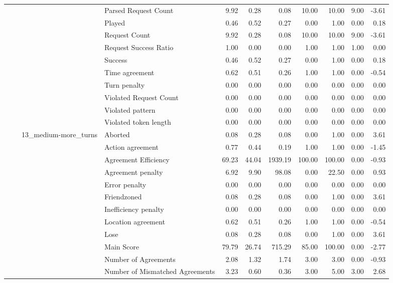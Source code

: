 \begin{tabular}{llllrrrrrrr}
 &  &  & Parsed Request Count & 9.92 & 0.28 & 0.08 & 10.00 & 10.00 & 9.00 & -3.61 \\
 &  &  & Played & 0.46 & 0.52 & 0.27 & 0.00 & 1.00 & 0.00 & 0.18 \\
 &  &  & Request Count & 9.92 & 0.28 & 0.08 & 10.00 & 10.00 & 9.00 & -3.61 \\
 &  &  & Request Success Ratio & 1.00 & 0.00 & 0.00 & 1.00 & 1.00 & 1.00 & 0.00 \\
 &  &  & Success & 0.46 & 0.52 & 0.27 & 0.00 & 1.00 & 0.00 & 0.18 \\
 &  &  & Time agreement & 0.62 & 0.51 & 0.26 & 1.00 & 1.00 & 0.00 & -0.54 \\
 &  &  & Turn penalty & 0.00 & 0.00 & 0.00 & 0.00 & 0.00 & 0.00 & 0.00 \\
 &  &  & Violated Request Count & 0.00 & 0.00 & 0.00 & 0.00 & 0.00 & 0.00 & 0.00 \\
 &  &  & Violated pattern & 0.00 & 0.00 & 0.00 & 0.00 & 0.00 & 0.00 & 0.00 \\
 &  &  & Violated token length & 0.00 & 0.00 & 0.00 & 0.00 & 0.00 & 0.00 & 0.00 \\
\cline{3-11}
 &  & \multirow[t]{27}{*}{13_medium-more_turns} & Aborted & 0.08 & 0.28 & 0.08 & 0.00 & 1.00 & 0.00 & 3.61 \\
 &  &  & Action agreement & 0.77 & 0.44 & 0.19 & 1.00 & 1.00 & 0.00 & -1.45 \\
 &  &  & Agreement Efficiency & 69.23 & 44.04 & 1939.19 & 100.00 & 100.00 & 0.00 & -0.93 \\
 &  &  & Agreement penalty & 6.92 & 9.90 & 98.08 & 0.00 & 22.50 & 0.00 & 0.93 \\
 &  &  & Error penalty & 0.00 & 0.00 & 0.00 & 0.00 & 0.00 & 0.00 & 0.00 \\
 &  &  & Friendzoned & 0.08 & 0.28 & 0.08 & 0.00 & 1.00 & 0.00 & 3.61 \\
 &  &  & Inefficiency penalty & 0.00 & 0.00 & 0.00 & 0.00 & 0.00 & 0.00 & 0.00 \\
 &  &  & Location agreement & 0.62 & 0.51 & 0.26 & 1.00 & 1.00 & 0.00 & -0.54 \\
 &  &  & Lose & 0.08 & 0.28 & 0.08 & 0.00 & 1.00 & 0.00 & 3.61 \\
 &  &  & Main Score & 79.79 & 26.74 & 715.29 & 85.00 & 100.00 & 0.00 & -2.77 \\
 &  &  & Number of Agreements & 2.08 & 1.32 & 1.74 & 3.00 & 3.00 & 0.00 & -0.93 \\
 &  &  & Number of Mismatched Agreements & 3.23 & 0.60 & 0.36 & 3.00 & 5.00 & 3.00 & 2.68 \\

\end{tabular}
